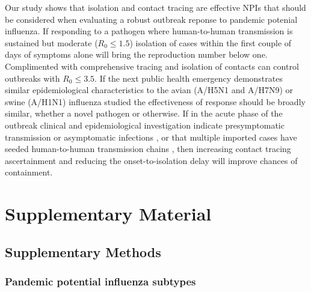 \documentclass{article}
\begin{document}
Our study shows that isolation and contact tracing are effective NPIs that should be considered when evaluating a robust outbreak reponse to pandemic potenial influenza. If responding to a pathogen where human-to-human transmission is sustained but moderate ($R_0 \leq 1.5$) isolation of cases within the first couple of days of symptoms alone will bring the reproduction number below one. Complimented with comprehensive tracing and isolation of contacts can control outbreaks with $R_0 \leq 3.5$. If the next public health emergency demonstrates similar epidemiological characteristics to the avian (A/H5N1 and A/H7N9) or swine (A/H1N1) influenza studied the effectiveness of response should be broadly similar, whether a novel pathogen or otherwise. If in the acute phase of the outbreak clinical and epidemiological investigation indicate presymptomatic transmission or asymptomatic infections \citep{liuContributionPresymptomaticInfection2020}, or that multiple imported cases have seeded human-to-human transmission chains \citep{russellEffectInternationallyImported2021}, then increasing contact tracing ascertainment and reducing the onset-to-isolation delay will improve chances of containment.




\clearpage

\section*{Supplementary Material}

\setcounter{figure}{0}
\renewcommand{\thefigure}{S\arabic{figure}}


\subsection*{Supplementary Methods}

\subsubsection*{Pandemic potential influenza subtypes}
\end{document}
